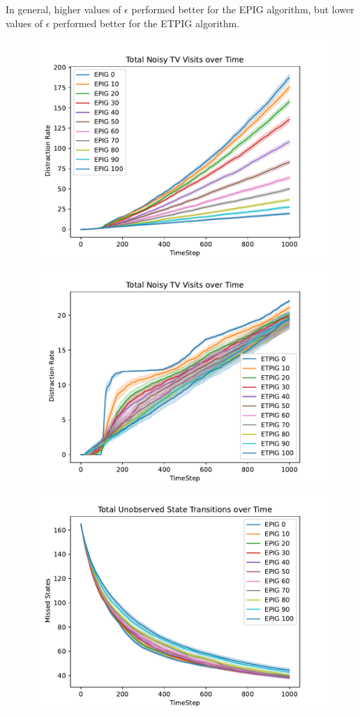 \documentclass[12pt]{thesis}
\begin{document}
In general, higher values of $\epsilon$ performed better for the EPIG algorithm, but lower values of $\epsilon$ performed better for the ETPIG algorithm.
\begin{figure}[p]
	\includegraphics[scale=0.5]{"images/Epsilon_Distractions_EPIG.pdf"}
	\includegraphics[scale=0.5]{"images/Epsilon_Distractions_ETPIG.pdf"}
	\includegraphics[scale=0.5]{"images/Epsilon_Missed_States_EPIG.pdf"}

\end{figure}
\end{document}
